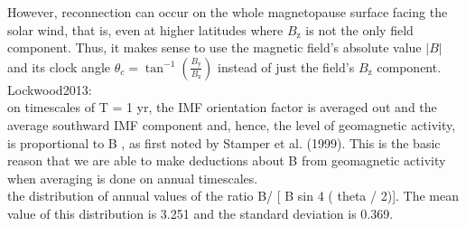 However, reconnection can occur on the whole magnetopause surface facing the solar wind, that is, even at higher latitudes where $B_\text{z}$ is not the only field component. Thus, it makes sense to use the magnetic field's absolute value $|B|$ and its clock angle $\theta_c = \tan^{-1}\left(\frac{B_\text{y}}{B_\text{z}}\right)$ instead of just the field's $B_\text{z}$ component.\\


Lockwood2013:\\
on timescales of T = 1 yr, the IMF orientation factor is averaged out and the average southward IMF component and, hence, the level of geomagnetic activity, is proportional to B , as first noted by Stamper et al. (1999). This is the basic reason that we are able to make deductions about B from geomagnetic activity when averaging is done on annual timescales.\\

the distribution of annual values of the ratio B/ [ B sin 4 ( theta / 2)]. The mean value of this distribution is 3.251 and the standard deviation is 0.369.\\




